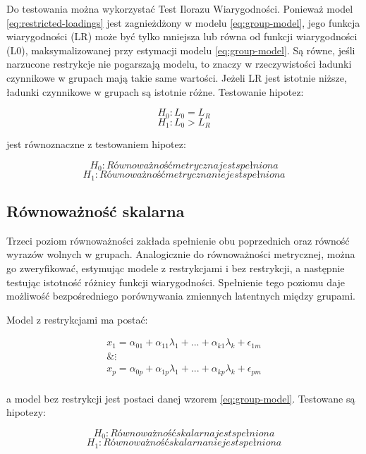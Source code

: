 \documentclass[12pt]{article}
\begin{document}
Do testowania można wykorzystać Test Ilorazu Wiarygodności. Ponieważ model \ref{eq:restricted-loadings} jest zagnieżdżony w modelu \ref{eq:group-model}, jego funkcja wiarygodności (LR) może być tylko mniejsza lub równa od funkcji wiarygodności (L0), maksymalizowanej przy estymacji modelu \ref{eq:group-model}. Są równe, jeśli narzucone restrykcje nie pogarszają modelu, to znaczy w rzeczywistości ładunki czynnikowe w grupach mają takie same wartości. Jeżeli LR jest istotnie niższe, ładunki czynnikowe w grupach są istotnie różne. Testowanie hipotez:

\[H_0: L_0 = L_R\]
\[H_1: L_0 > L_R\]

jest równoznaczne z testowaniem hipotez:

\[H_0: Równoważność metryczna jest spełniona\]
\[H_1: Równoważność metryczna nie jest spełniona\]

\hypertarget{ruxf3wnowaux17cnoux15bux107-skalarna}{%
\subsection{Równoważność skalarna}\label{ruxf3wnowaux17cnoux15bux107-skalarna}}

Trzeci poziom równoważności zakłada spełnienie obu poprzednich oraz równość wyrazów wolnych w grupach. Analogicznie do równoważności metrycznej, można go zweryfikować, estymując modele z restrykcjami i bez restrykcji, a następnie testując istotność różnicy funkcji wiarygodności. Spełnienie tego poziomu daje możliwość bezpośredniego porównywania zmiennych latentnych między grupami.

Model z restrykcjami ma postać:

\begin{equation}
\label{eq:restricted-intercepts}
\begin{aligned} 
x_1 = \alpha_{01} + \alpha_{11} \lambda_1 + ... + \alpha_{k1} \lambda_k + \epsilon_{1m}\\
\& \vdots \\
x_p = \alpha_{0p} + \alpha_{1p} \lambda_1 + ... + \alpha_{kp} \lambda_k + \epsilon_{pm}\\
\end{aligned}
\end{equation}

a model bez restrykcji jest postaci danej wzorem \ref{eq:group-model}. Testowane są hipotezy:

\[H_0: Równoważność skalarna jest spełniona\]
\[H_1: Równoważność skalarna nie jest spełniona\]
\end{document}
